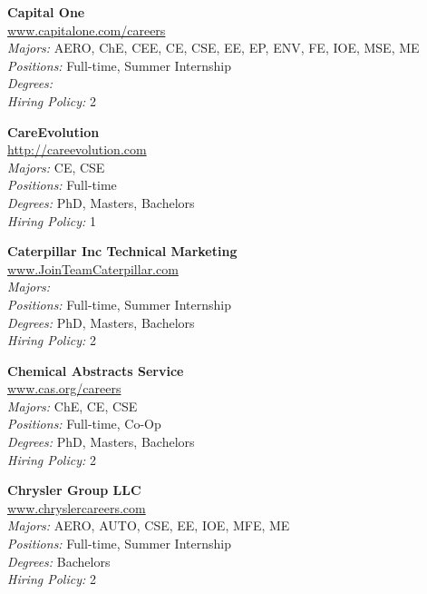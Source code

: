 \documentclass[twoside]{article}
\begin{document}
\begin{center}
\begin{multicols}{3}
\begin{minipage}{.9\columnwidth}{\Large\bf Capital One }\\
	\url{www.capitalone.com/careers}\\
	\emph{Majors:} AERO, ChE, CEE, CE, CSE, EE, EP, ENV, FE, IOE, MSE, ME\\
	\emph{Positions:} Full-time, Summer Internship\\
	\emph{Degrees:} \\
	\emph{Hiring Policy:} 2\\
\end{minipage}
 
\begin{minipage}{.9\columnwidth}{\Large\bf CareEvolution }\\
	\url{http://careevolution.com}\\
	\emph{Majors:} CE, CSE\\
	\emph{Positions:} Full-time\\
	\emph{Degrees:} PhD, Masters, Bachelors\\
	\emph{Hiring Policy:} 1\\
\end{minipage}
 
\begin{minipage}{.9\columnwidth}{\Large\bf Caterpillar Inc Technical Marketing }\\
	\url{www.JoinTeamCaterpillar.com}\\
	\emph{Majors:} \\
	\emph{Positions:} Full-time, Summer Internship\\
	\emph{Degrees:} PhD, Masters, Bachelors\\
	\emph{Hiring Policy:} 2\\
\end{minipage}
 
\begin{minipage}{.9\columnwidth}{\Large\bf Chemical Abstracts Service }\\
	\url{www.cas.org/careers}\\
	\emph{Majors:} ChE, CE, CSE\\
	\emph{Positions:} Full-time, Co-Op\\
	\emph{Degrees:} PhD, Masters, Bachelors\\
	\emph{Hiring Policy:} 2\\
\end{minipage}
 
\begin{minipage}{.9\columnwidth}{\Large\bf Chrysler Group LLC }\\
	\url{www.chryslercareers.com}\\
	\emph{Majors:} AERO, AUTO, CSE, EE, IOE, MFE, ME\\
	\emph{Positions:} Full-time, Summer Internship\\
	\emph{Degrees:} Bachelors\\
	\emph{Hiring Policy:} 2\\
\end{minipage}
 

\end{multicols}
\end{center}
\end{document}
